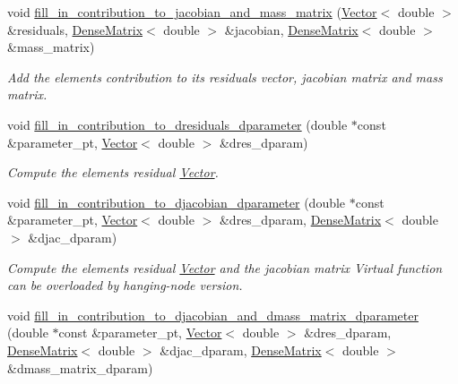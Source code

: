 \begin{DoxyCompactItemize}
void \hyperlink{classoomph_1_1NavierStokesEquations_a550fe44fb346cf92e8e7e4588ee0b97d}{fill\+\_\+in\+\_\+contribution\+\_\+to\+\_\+jacobian\+\_\+and\+\_\+mass\+\_\+matrix} (\hyperlink{classoomph_1_1Vector}{Vector}$<$ double $>$ \&residuals, \hyperlink{classoomph_1_1DenseMatrix}{Dense\+Matrix}$<$ double $>$ \&jacobian, \hyperlink{classoomph_1_1DenseMatrix}{Dense\+Matrix}$<$ double $>$ \&mass\+\_\+matrix)
\begin{DoxyCompactList}\small\item\em Add the element\textquotesingle{}s contribution to its residuals vector, jacobian matrix and mass matrix. \end{DoxyCompactList}\item 
void \hyperlink{classoomph_1_1NavierStokesEquations_a2a7ca03e4f74fabe48dcd9da0fa6d185}{fill\+\_\+in\+\_\+contribution\+\_\+to\+\_\+dresiduals\+\_\+dparameter} (double $\ast$const \&parameter\+\_\+pt, \hyperlink{classoomph_1_1Vector}{Vector}$<$ double $>$ \&dres\+\_\+dparam)
\begin{DoxyCompactList}\small\item\em Compute the element\textquotesingle{}s residual \hyperlink{classoomph_1_1Vector}{Vector}. \end{DoxyCompactList}\item 
void \hyperlink{classoomph_1_1NavierStokesEquations_a93c137baa292eea6159ea74fc667f7de}{fill\+\_\+in\+\_\+contribution\+\_\+to\+\_\+djacobian\+\_\+dparameter} (double $\ast$const \&parameter\+\_\+pt, \hyperlink{classoomph_1_1Vector}{Vector}$<$ double $>$ \&dres\+\_\+dparam, \hyperlink{classoomph_1_1DenseMatrix}{Dense\+Matrix}$<$ double $>$ \&djac\+\_\+dparam)
\begin{DoxyCompactList}\small\item\em Compute the element\textquotesingle{}s residual \hyperlink{classoomph_1_1Vector}{Vector} and the jacobian matrix Virtual function can be overloaded by hanging-\/node version. \end{DoxyCompactList}\item 
void \hyperlink{classoomph_1_1NavierStokesEquations_afc1a9658058fb9183b89e5d3a4dabee0}{fill\+\_\+in\+\_\+contribution\+\_\+to\+\_\+djacobian\+\_\+and\+\_\+dmass\+\_\+matrix\+\_\+dparameter} (double $\ast$const \&parameter\+\_\+pt, \hyperlink{classoomph_1_1Vector}{Vector}$<$ double $>$ \&dres\+\_\+dparam, \hyperlink{classoomph_1_1DenseMatrix}{Dense\+Matrix}$<$ double $>$ \&djac\+\_\+dparam, \hyperlink{classoomph_1_1DenseMatrix}{Dense\+Matrix}$<$ double $>$ \&dmass\+\_\+matrix\+\_\+dparam)
\item 

\end{DoxyCompactItemize}
